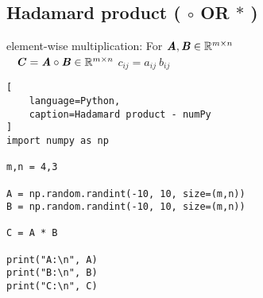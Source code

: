 \subsection{Hadamard product ( $\circ$ OR $\ast$ ) \cite{mfml/book/mml/Deisenroth-Faisal-Ong}}

element-wise multiplication: For $\text{\textbf{\textit{A}}}, \text{\textbf{\textit{B}}} \in \mathbb{R}^{m\times n}$
\\
\ 
\hfill
$
    \text{\textbf{\textit{C}}} = \text{\textbf{\textit{A}}} \circ \text{\textbf{\textit{B}}} \in \mathbb{R}^{m\times n}
$
\hfill
$
    c_{ij} = a_{ij}\ b_{ij}
$
\hfill
\ 













\begin{lstlisting}[
    language=Python,
    caption=Hadamard product - numPy
]
import numpy as np

m,n = 4,3

A = np.random.randint(-10, 10, size=(m,n))
B = np.random.randint(-10, 10, size=(m,n))

C = A * B

print("A:\n", A)
print("B:\n", B)
print("C:\n", C)
\end{lstlisting}










